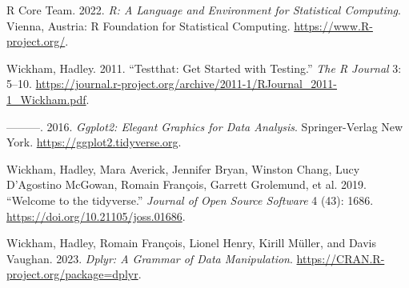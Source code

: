 \documentclass[
  letterpaper,
  DIV=11,
  numbers=noendperiod]{scrartcl}
\newlength{\cslhangindent}
\newenvironment{CSLReferences}[2] %
 {\begin{list}{}{%
  \setlength{\itemindent}{0pt}
  \setlength{\leftmargin}{0pt}
  \setlength{\parsep}{0pt}
  \ifodd #1
   \setlength{\leftmargin}{\cslhangindent}
   \setlength{\itemindent}{-1\cslhangindent}
  \fi
  \setlength{\itemsep}{#2\baselineskip}}}
 {\end{list}}
\begin{document}
\begin{CSLReferences}{1}{0}
R Core Team. 2022. \emph{R: A Language and Environment for Statistical
Computing}. Vienna, Austria: R Foundation for Statistical Computing.
\url{https://www.R-project.org/}.

Wickham, Hadley. 2011. {``Testthat: Get Started with Testing.''}
\emph{The R Journal} 3: 5--10.
\url{https://journal.r-project.org/archive/2011-1/RJournal_2011-1_Wickham.pdf}.

---------. 2016. \emph{Ggplot2: Elegant Graphics for Data Analysis}.
Springer-Verlag New York. \url{https://ggplot2.tidyverse.org}.

Wickham, Hadley, Mara Averick, Jennifer Bryan, Winston Chang, Lucy
D'Agostino McGowan, Romain François, Garrett Grolemund, et al. 2019.
{``Welcome to the {tidyverse}.''} \emph{Journal of Open Source Software}
4 (43): 1686. \url{https://doi.org/10.21105/joss.01686}.

Wickham, Hadley, Romain François, Lionel Henry, Kirill Müller, and Davis
Vaughan. 2023. \emph{Dplyr: A Grammar of Data Manipulation}.
\url{https://CRAN.R-project.org/package=dplyr}.

\end{CSLReferences}
\end{document}
